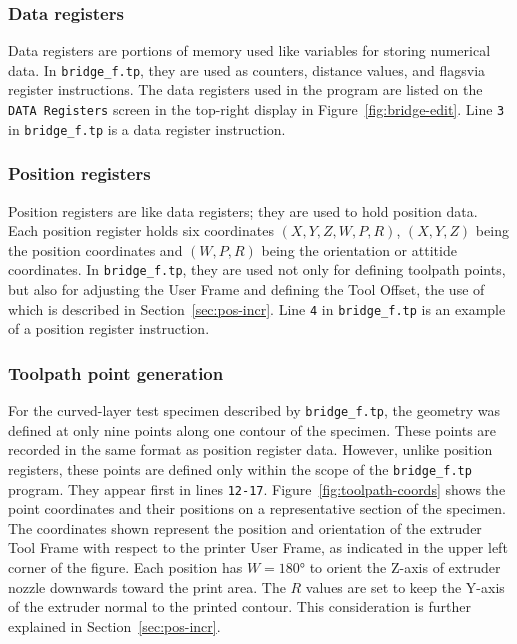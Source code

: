 \subsubsection{Data registers}
Data registers are portions of memory used like variables for storing numerical data\cite[sec~7.3]{lr-handling-tool}. In \verb|bridge_f.tp|, they are used as counters, distance values, and flagsvia register instructions\cite[sec~4.5.1]{lr-handling-tool}. The data registers used in the program are listed on the \verb|DATA Registers| screen in the top-right display in Figure~\ref{fig:bridge-edit}. Line \verb|3| in \verb|bridge_f.tp| is a data register instruction.

\subsubsection{Position registers}
Position registers are like data registers; they are used to hold position data\cite[sec~7.4]{lr-handling-tool}. Each position register holds six coordinates \((X,Y,Z,W,P,R)\), \((X,Y,Z)\) being the position coordinates and \((W,P,R)\) being the orientation or attitide coordinates.  In \verb|bridge_f.tp|, they are used not only for defining toolpath points, but also for adjusting the User Frame and defining the Tool Offset, the use of which is described in Section~\ref{sec:pos-incr}. Line \verb|4| in \verb|bridge_f.tp| is an example of a position register instruction.

\subsubsection{Toolpath point generation}
\label{sec:point-gen}
For the curved-layer test specimen described by \verb|bridge_f.tp|, the geometry was defined at only nine points along one contour of the specimen. These points are recorded in the same format as position register data. However, unlike position registers, these points are defined only within the scope of the \verb|bridge_f.tp| program. They appear first in lines \verb|12-17|. Figure~\ref{fig:toolpath-coords} shows the point coordinates and their positions on a representative section of the specimen. The coordinates shown represent the position and orientation of the extruder Tool Frame with respect to the printer User Frame, as indicated in the upper left corner of the figure. Each position has \(W = 180\si{\degree}\) to orient the Z-axis of extruder nozzle downwards toward the print area. The \(R\) values are set to keep the Y-axis of the extruder normal to the printed contour. This consideration is further explained in Section~\ref{sec:pos-incr}.

